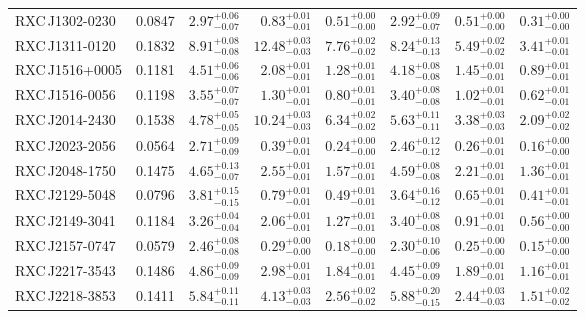 \begin{table*}
\begin{tabular}{l l l r r l r r}
    RXC\,J1302-0230 & 0.0847 & $2.97_{-0.07}^{+0.06}$ & $ 0.83_{-0.01}^{+0.01}$ & $ 0.51_{-0.00}^{+0.00}$ & $2.92_{-0.07}^{+0.09}$ & $ 0.51_{-0.00}^{+0.00}$ & $ 0.31_{-0.00}^{+0.00}$ \\
    RXC\,J1311-0120 & 0.1832 & $8.91_{-0.08}^{+0.08}$ & $12.48_{-0.03}^{+0.03}$ & $ 7.76_{-0.02}^{+0.02}$ & $8.24_{-0.13}^{+0.13}$ & $ 5.49_{-0.02}^{+0.02}$ & $ 3.41_{-0.01}^{+0.01}$ \\
    RXC\,J1516+0005 & 0.1181 & $4.51_{-0.06}^{+0.06}$ & $ 2.08_{-0.01}^{+0.01}$ & $ 1.28_{-0.01}^{+0.01}$ & $4.18_{-0.08}^{+0.08}$ & $ 1.45_{-0.01}^{+0.01}$ & $ 0.89_{-0.01}^{+0.01}$ \\
    RXC\,J1516-0056 & 0.1198 & $3.55_{-0.07}^{+0.07}$ & $ 1.30_{-0.01}^{+0.01}$ & $ 0.80_{-0.01}^{+0.01}$ & $3.40_{-0.08}^{+0.08}$ & $ 1.02_{-0.01}^{+0.01}$ & $ 0.62_{-0.01}^{+0.01}$ \\
    RXC\,J2014-2430 & 0.1538 & $4.78_{-0.05}^{+0.05}$ & $10.24_{-0.03}^{+0.03}$ & $ 6.34_{-0.02}^{+0.02}$ & $5.63_{-0.11}^{+0.11}$ & $ 3.38_{-0.03}^{+0.03}$ & $ 2.09_{-0.02}^{+0.02}$ \\
    RXC\,J2023-2056 & 0.0564 & $2.71_{-0.09}^{+0.09}$ & $ 0.39_{-0.01}^{+0.01}$ & $ 0.24_{-0.00}^{+0.00}$ & $2.46_{-0.12}^{+0.12}$ & $ 0.26_{-0.01}^{+0.01}$ & $ 0.16_{-0.00}^{+0.00}$ \\
    RXC\,J2048-1750 & 0.1475 & $4.65_{-0.07}^{+0.13}$ & $ 2.55_{-0.01}^{+0.01}$ & $ 1.57_{-0.01}^{+0.01}$ & $4.59_{-0.08}^{+0.08}$ & $ 2.21_{-0.01}^{+0.01}$ & $ 1.36_{-0.01}^{+0.01}$ \\
    RXC\,J2129-5048 & 0.0796 & $3.81_{-0.15}^{+0.15}$ & $ 0.79_{-0.01}^{+0.01}$ & $ 0.49_{-0.01}^{+0.01}$ & $3.64_{-0.12}^{+0.16}$ & $ 0.65_{-0.01}^{+0.01}$ & $ 0.41_{-0.01}^{+0.01}$ \\
    RXC\,J2149-3041 & 0.1184 & $3.26_{-0.04}^{+0.04}$ & $ 2.06_{-0.01}^{+0.01}$ & $ 1.27_{-0.01}^{+0.01}$ & $3.40_{-0.08}^{+0.08}$ & $ 0.91_{-0.01}^{+0.01}$ & $ 0.56_{-0.00}^{+0.00}$ \\
    RXC\,J2157-0747 & 0.0579 & $2.46_{-0.08}^{+0.08}$ & $ 0.29_{-0.00}^{+0.00}$ & $ 0.18_{-0.00}^{+0.00}$ & $2.30_{-0.06}^{+0.10}$ & $ 0.25_{-0.00}^{+0.00}$ & $ 0.15_{-0.00}^{+0.00}$ \\
    RXC\,J2217-3543 & 0.1486 & $4.86_{-0.09}^{+0.09}$ & $ 2.98_{-0.01}^{+0.01}$ & $ 1.84_{-0.01}^{+0.01}$ & $4.45_{-0.09}^{+0.09}$ & $ 1.89_{-0.01}^{+0.01}$ & $ 1.16_{-0.01}^{+0.01}$ \\
    RXC\,J2218-3853 & 0.1411 & $5.84_{-0.11}^{+0.11}$ & $ 4.13_{-0.03}^{+0.03}$ & $ 2.56_{-0.02}^{+0.02}$ & $5.88_{-0.15}^{+0.20}$ & $ 2.44_{-0.03}^{+0.03}$ & $ 1.51_{-0.02}^{+0.02}$ \\

\end{tabular}
\end{table*}
